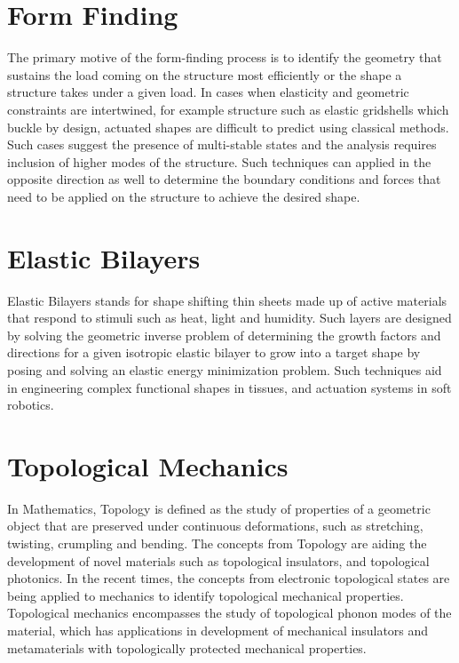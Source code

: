\section{Form Finding}
The primary motive of the form-finding process is to identify the geometry that sustains the load coming on the structure most efficiently or the shape a structure takes under a given load. In cases when elasticity and geometric constraints are intertwined, for example structure such as elastic gridshells which buckle by design, actuated shapes are difficult to predict using classical methods. Such cases suggest the presence of multi-stable states and the analysis requires inclusion of higher modes of the structure. Such techniques can applied in the opposite direction as well to determine the boundary conditions and forces that need to be applied on the structure to achieve the desired shape.\cite{Baek75} 

\section{Elastic Bilayers}
Elastic Bilayers stands for shape shifting thin sheets made up of active materials that respond to stimuli such as heat, light and humidity. Such layers are designed by solving the geometric inverse problem of determining the growth factors and directions for a given isotropic elastic bilayer to grow into a target shape by posing and solving an elastic energy minimization problem. Such techniques aid in engineering complex functional shapes in tissues, and actuation systems in soft robotics.\cite{va}

\section{Topological Mechanics}
In Mathematics, Topology is defined as the study of properties of a geometric object that are preserved under continuous deformations, such as stretching, twisting, crumpling and bending. The concepts from Topology are aiding the development of novel materials such as topological insulators, and topological photonics. In the recent times, the concepts from electronic topological states are being applied to mechanics to identify topological mechanical properties. Topological mechanics encompasses the study of topological phonon modes of the material, which has applications in development of mechanical insulators and metamaterials with topologically protected mechanical properties.\cite{Ma, Rock, Baardink489, Che}

